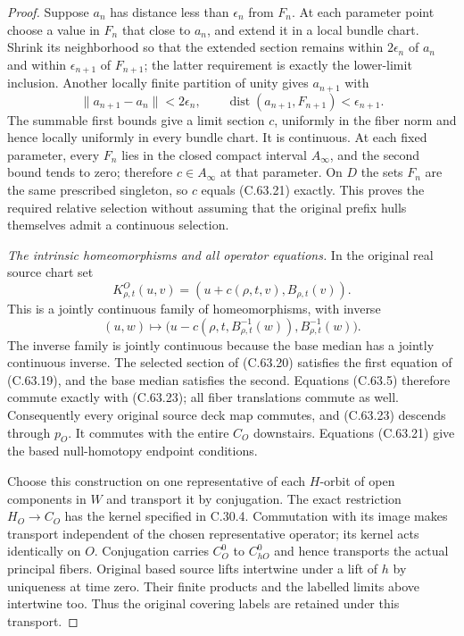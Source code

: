 \begin{proof}
Suppose $a_n$ has distance less than
$\epsilon_n$ from $F_n$. At each parameter
point choose a value in $F_n$ that close to
$a_n$, and extend it in a local bundle chart.
Shrink its neighborhood so that the extended
section remains within $2\epsilon_n$ of
$a_n$ and within $\epsilon_{n+1}$ of
$F_{n+1}$; the latter requirement is exactly
the lower-limit inclusion. Another locally
finite partition of unity gives $a_{n+1}$
with
\[
 \|a_{n+1}-a_n\|<2\epsilon_n,
       \qquad \operatorname{dist}(a_{n+1},F_{n+1})
                                      <\epsilon_{n+1}.
                                                               \tag{C.63.22}
\]
The summable first bounds give a limit section
$c$, uniformly in the fiber norm and hence
locally uniformly in every bundle chart.
It is continuous. At each fixed parameter,
every $F_n$ lies in the closed compact interval
$A_\infty$, and the second bound tends to zero;
therefore $c\in A_\infty$ at that parameter.
On $D$ the sets $F_n$ are the same prescribed
singleton, so $c$ equals (C.63.21) exactly.
This proves the required relative selection
without assuming that the original prefix
hulls themselves admit a continuous selection.

\emph{The intrinsic homeomorphisms and all operator equations.}
In the original real source chart set
\[
 K_{\rho,t}^O(u,v)
       =(u+c(\rho,t,v),B_{\rho,t}(v)).                 \tag{C.63.23}
\]
This is a jointly continuous family of
homeomorphisms, with inverse
\[
 (u,w)\longmapsto
 \bigl(u-c(\rho,t,B_{\rho,t}^{-1}(w)),
                         B_{\rho,t}^{-1}(w)\bigr).
                                                               \tag{C.63.24}
\]
The inverse family is jointly continuous
because the base median has a jointly
continuous inverse. The selected section
of (C.63.20) satisfies the first equation
of (C.63.19), and the base median satisfies
the second. Equations (C.63.5) therefore
commute exactly with (C.63.23); all fiber
translations commute as well. Consequently
every original source deck map commutes,
and (C.63.23) descends through $p_O$.
It commutes with the entire $C_O$ downstairs.
Equations (C.63.21) give the based
null-homotopy endpoint conditions.

Choose this construction on one representative
of each $H$-orbit of open components in $W$
and transport it by conjugation. The exact
restriction $H_O\to C_O$ has the kernel
specified in C.30.4. Commutation with its
image makes transport independent of the
chosen representative operator; its kernel
acts identically on $O$. Conjugation carries
$C_O^0$ to $C_{hO}^0$ and hence transports
the actual principal fibers. Original based
source lifts intertwine under a lift of $h$
by uniqueness at time zero. Their finite
products and the labelled limits above
intertwine too. Thus the original covering
labels are retained under this transport.


\end{proof}
